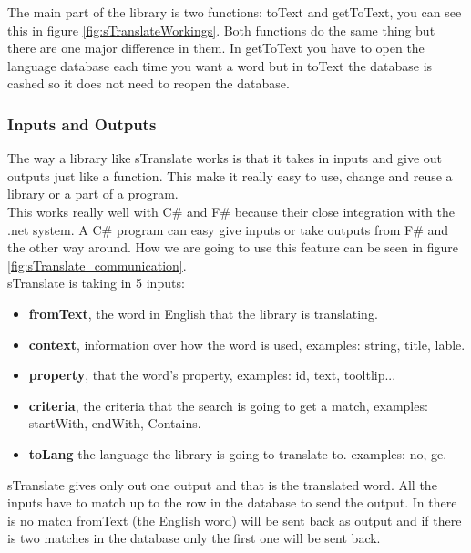 \documentclass[12pt, a4paper]{article}
\begin{document}
The main part of the library is two functions: toText and getToText, you can see this in figure \ref{fig:sTranslateWorkings}. Both functions do the same thing but there are one major difference in them. In getToText you have to open the language database each time you want a word but in toText the database is cashed so it does not need to reopen the database.\\

\newpage
\subsubsection{Inputs and Outputs}
The way a library like sTranslate works is that it takes in inputs and give out outputs just like a function. This make it really easy to use, change and reuse a library or a part of a program.\\

This works really well with C\# and F\# because their close integration with the .net system. A C\# program can easy give inputs or take outputs from F\# and the other way around. How we are going to use this feature can be seen in figure \ref{fig:sTranslate_communication}.\\

sTranslate is taking in 5 inputs:

\begin{itemize}
	\item \textbf{fromText}, the word in English that the library is translating. 
	\item \textbf{context}, information over how the word is used, examples: string, title, lable.  
	\item \textbf{property}, that the word's property, examples: id, text, tooltlip...  
	\item \textbf{criteria}, the criteria that the search is going to get a match, examples: startWith, endWith, Contains.
	\item \textbf{toLang} the language the library is going to translate to.  examples: no, ge.
\end{itemize}

sTranslate gives only out one output and that is the translated word. All the inputs have to match up to the row in the database to send the output. In there is no match fromText (the English word) will be sent back as output and if there is two matches in the database only the first one will be sent back.\\


\newpage
\end{document}
